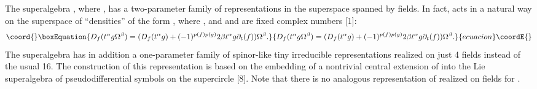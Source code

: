 \documentclass[a4paper,a4paper]{article}
\begin{document}
The superalgebra \coordHE{}, where \coordHE{},
has a two-parameter family of representations in the superspace 
spanned by \coordHE{} fields. In fact, \coordHE{} acts in a natural way
on the superspace of ``densities'' of the form
\coordHE{}, where \coordHE{}, and
\myHighlight{$\alpha$}\coordHE{} and \myHighlight{$\beta$}\coordHE{} are fixed
complex numbers [1]:
\begin{equation}\coord{}\boxEquation{
D_f(t^{\alpha}g\Omega^{\beta}) =
(D_f(t^{\alpha}g) + (-1)^{p(f)p(g)}2\beta t^{\alpha}g\partial_t(f))
\Omega^{\beta}.
}{
D_f(t^{\alpha}g\Omega^{\beta}) =
(D_f(t^{\alpha}g) + (-1)^{p(f)p(g)}2\beta t^{\alpha}g\partial_t(f))
\Omega^{\beta}.
}{ecuacion}\coordE{}\end{equation}
The superalgebra \coordHE{} has in addition a one-parameter family of spinor-like tiny
irreducible representations realized on just 4 fields instead of the
usual 16. The construction of this representation is based on the
embedding of a nontrivial central extension 
of  \coordHE{} into the Lie superalgebra of pseudodifferential symbols on
the supercircle   \coordHE{} [8]. Note that there is no analogous
representation of \coordHE{} realized on \coordHE{} fields for \coordHE{}.
\end{document}

